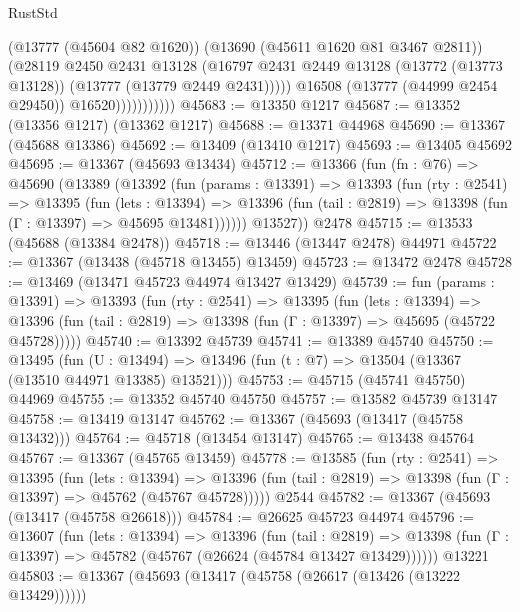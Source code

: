 \begin{lexlean}{RustStd}
\begin{coremodule}
                            (@13777 (@45604 @82 @1620))
                            (@13690 (@45611 @1620 @81 @3467 @2811))
                            (@28119
                              @2450
                              @2431
                              @13128
                              (@16797
                                @2431
                                @2449
                                @13128
                                (@13772 (@13773 @13128))
                                (@13777 (@13779 @2449 @2431)))))
                          @16508
                          (@13777 (@44999 @2454 @29450))
                          @16520)))))))))))
@45683 := @13350 @1217
@45687 := @13352 (@13356 @1217) (@13362 @1217)
@45688 := @13371 @44968
@45690 := @13367 (@45688 @13386)
@45692 := @13409 (@13410 @1217)
@45693 := @13405 @45692
@45695 := @13367 (@45693 @13434)
@45712 := @13366
    (fun (fn : @76) =>
    @45690
      (@13389
        (@13392
          (fun (params : @13391) =>
          @13393
            (fun (rty : @2541) =>
            @13395
              (fun (lets : @13394) =>
              @13396 (fun (tail : @2819) => @13398 (fun (Γ : @13397) => @45695 @13481))))))
        @13527))
    @2478
@45715 := @13533 (@45688 (@13384 @2478))
@45718 := @13446 (@13447 @2478) @44971
@45722 := @13367 (@13438 (@45718 @13455) @13459)
@45723 := @13472 @2478
@45728 := @13469 (@13471 @45723 @44974 @13427 @13429)
@45739 := fun (params : @13391) =>
  @13393
    (fun (rty : @2541) =>
    @13395
      (fun (lets : @13394) =>
      @13396 (fun (tail : @2819) => @13398 (fun (Γ : @13397) => @45695 (@45722 @45728)))))
@45740 := @13392 @45739
@45741 := @13389 @45740
@45750 := @13495
    (fun (U : @13494) => @13496 (fun (t : @7) => @13504 (@13367 (@13510 @44971 @13385) @13521)))
@45753 := @45715 (@45741 @45750) @44969
@45755 := @13352 @45740 @45750
@45757 := @13582 @45739 @13147
@45758 := @13419 @13147
@45762 := @13367 (@45693 (@13417 (@45758 @13432)))
@45764 := @45718 (@13454 @13147)
@45765 := @13438 @45764
@45767 := @13367 (@45765 @13459)
@45778 := @13585
    (fun (rty : @2541) =>
    @13395
      (fun (lets : @13394) =>
      @13396 (fun (tail : @2819) => @13398 (fun (Γ : @13397) => @45762 (@45767 @45728)))))
    @2544
@45782 := @13367 (@45693 (@13417 (@45758 @26618)))
@45784 := @26625 @45723 @44974
@45796 := @13607
    (fun (lets : @13394) =>
    @13396
      (fun (tail : @2819) =>
      @13398 (fun (Γ : @13397) => @45782 (@45767 (@26624 (@45784 @13427 @13429))))))
    @13221
@45803 := @13367 (@45693 (@13417 (@45758 (@26617 (@13426 (@13222 @13429))))))

\end{coremodule}
\end{lexlean}
